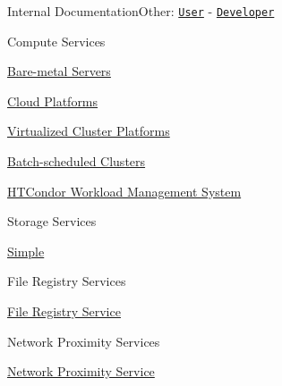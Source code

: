 Internal DocumentationOther\+: \href{../user/guide.html}{\tt User} -\/ \href{../developer/guide.html}{\tt Developer}


\begin{DoxyEnumerate}
\item Compute Services
\begin{DoxyEnumerate}
\item \hyperlink{guide-baremetal}{Bare-\/metal Servers}
\item \hyperlink{guide-cloud}{Cloud Platforms}
\item \hyperlink{guide-virtualizedcluster}{Virtualized Cluster Platforms}
\item \hyperlink{guide-batch}{Batch-\/scheduled Clusters}
\item \hyperlink{guide-htcondor}{H\+T\+Condor Workload Management System}
\end{DoxyEnumerate}
\item Storage Services
\begin{DoxyEnumerate}
\item \hyperlink{guide-simplestorage}{Simple}
\end{DoxyEnumerate}
\item File Registry Services
\begin{DoxyEnumerate}
\item \hyperlink{guide-fileregistry}{File Registry Service}
\end{DoxyEnumerate}
\item Network Proximity Services
\begin{DoxyEnumerate}
\item \hyperlink{guide-networkproximity}{Network Proximity Service} 
\end{DoxyEnumerate}
\end{DoxyEnumerate}